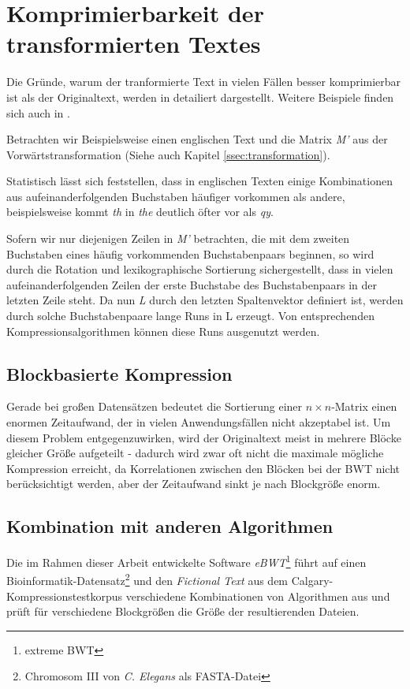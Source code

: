 \documentclass[ngerman,pdftex,paper=A4,DIV=calc,titlepage,12pt]{scrartcl}
\newtheorem[L]{boxedDefinition}{Definition}
\begin{document}
\section{Komprimierbarkeit der transformierten Textes}
Die Gründe, warum der tranformierte Text in vielen Fällen besser komprimierbar ist als der Originaltext, werden in \cite{burrows1994block} detailiert dargestellt. Weitere Beispiele finden sich auch in \cite{Wik2012-1}.

Betrachten wir Beispielsweise einen englischen Text und die Matrix \textit{M'} aus der Vorwärtstransformation (Siehe auch Kapitel \vref{ssec:transformation}).

Statistisch lässt sich feststellen, dass in englischen Texten einige Kombinationen aus aufeinanderfolgenden Buchstaben häufiger vorkommen als andere, beispielsweise kommt \textit{th} in \textit{the} deutlich öfter vor als \textit{qy}.

Sofern wir nur diejenigen Zeilen in \textit{M'} betrachten, die mit dem zweiten Buchstaben eines häufig vorkommenden Buchstabenpaars beginnen, so wird durch die Rotation und lexikographische Sortierung sichergestellt, dass    in vielen aufeinanderfolgenden Zeilen der erste Buchstabe des Buchstabenpaars in der letzten Zeile steht. Da nun \textit{L} durch den letzten Spaltenvektor definiert ist, werden durch solche Buchstabenpaare lange Runs in L erzeugt. Von entsprechenden Kompressionsalgorithmen können diese Runs ausgenutzt werden.

\subsection{Blockbasierte Kompression}
Gerade bei großen Datensätzen bedeutet die Sortierung einer $n \times n$-Matrix einen enormen Zeitaufwand, der in vielen Anwendungsfällen nicht akzeptabel ist. Um diesem Problem entgegenzuwirken, wird der Originaltext meist in mehrere Blöcke gleicher Größe aufgeteilt - dadurch wird zwar oft nicht die maximale mögliche Kompression erreicht, da Korrelationen zwischen den Blöcken bei der BWT nicht berücksichtigt werden, aber der Zeitaufwand sinkt je nach Blockgröße enorm.

\subsection{Kombination mit anderen Algorithmen}
Die im Rahmen dieser Arbeit entwickelte Software \textit{eBWT}\footnote{extreme BWT} führt auf einen Bioinformatik-Datensatz\footnote{Chromosom III von \textit{C. Elegans} als FASTA-Datei} und den \textit{Fictional Text} aus dem Calgary-Kompressionstestkorpus verschiedene Kombinationen von Algorithmen aus und prüft für verschiedene Blockgrößen die Größe der resultierenden Dateien.
\end{document}
